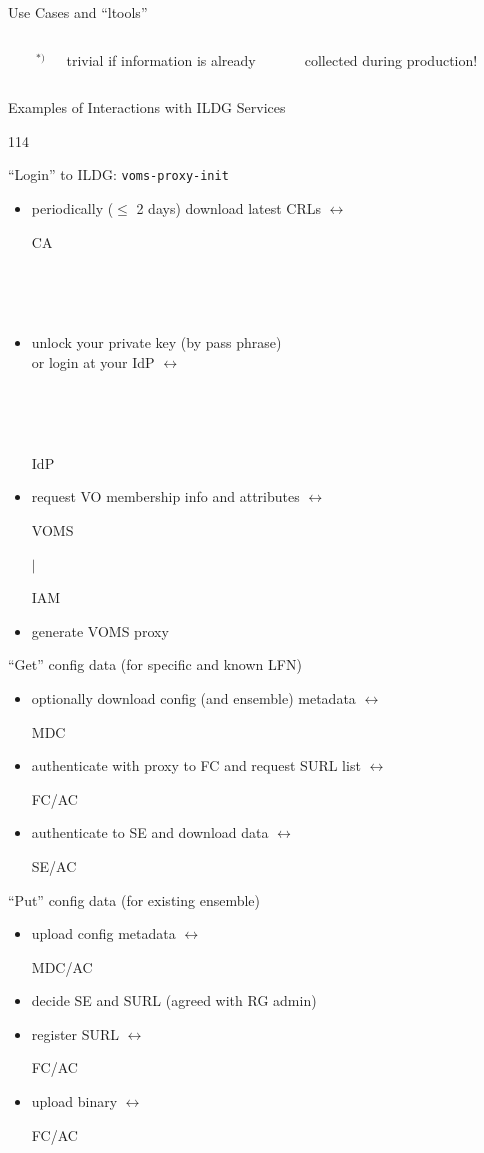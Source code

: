 \documentclass[aspectratio=169,xcolor=dvipsnames]{beamer}
\newcommand{\bi}{\begin{itemize}}
\newcommand{\ei}{\end{itemize}}
\begin{document}
\begin{frame}{Use Cases and  ``ltools''}
  \vspace*{5mm}
  \begin{columns}  
    \column{\lcol}
    ~
    \column{\rcol}
           {\small \parbox{2em}{\hfill ${}^{*)}$} trivial if information is already\\
             \parbox{2em}{~} collected during production!}
  \end{columns}

\end{frame}
\begin{frame}{Examples of Interactions with ILDG Services}

  \begin{dinglist}{114} \setlength{\itemsep}{2mm}
    \item ``Login'' to ILDG: {\tt voms-proxy-init}
      \bi
      \item periodically ($\le$ 2 days) download latest CRLs \hfill $\longleftrightarrow$ \parbox{4em}{CA}$~$ \parbox{4em}{~}
      \item unlock your private key (by pass phrase) \\[-1mm]
        or login at your IdP                                 \hfill $\longleftrightarrow$ \parbox{4em}{~}$~$ \parbox{4em}{IdP}
      \item request VO membership info and attributes        \hfill $\longleftrightarrow$ \parbox{4em}{VOMS}$\vert$ \parbox{4em}{IAM}
      \item generate VOMS proxy 
      \ei
    \item ``Get'' config data (for specific and known LFN)
      \bi
      \item optionally download config (and ensemble) metadata  \hfill $\longleftrightarrow$ \parbox{8em}{MDC}
      \item authenticate with proxy to FC and request SURL list \hfill $\longleftrightarrow$ \parbox{8em}{FC/AC}
      \item authenticate to SE and download data                \hfill $\longleftrightarrow$ \parbox{8em}{SE/AC}
      \ei
    \item ``Put'' config data (for existing ensemble)
      \bi
      \item upload config metadata                              \hfill $\longleftrightarrow$ \parbox{8em}{MDC/AC}
      \item decide SE and SURL (agreed with RG admin)
      \item register SURL                                       \hfill $\longleftrightarrow$ \parbox{8em}{FC/AC}
      \item upload binary                                       \hfill $\longleftrightarrow$ \parbox{8em}{FC/AC}
      \ei  
  \end{dinglist}
  \vfill
\end{frame}
\end{document}
